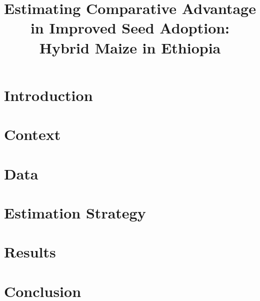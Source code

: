 \documentclass{article}
\title{Estimating Comparative Advantage in Improved Seed Adoption: Hybrid Maize in Ethiopia}
\begin{document}
\maketitle

\section{Introduction}

\section{Context}

\section{Data}

\section{Estimation Strategy}

\section{Results}

\section{Conclusion}
\end{document}
